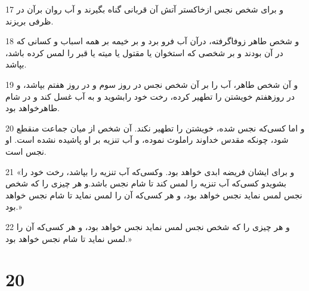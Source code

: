 \par 17 و برای شخص نجس ازخاکستر آتش آن قربانی گناه بگیرند و آب روان برآن در ظرفی بریزند.
\par 18 و شخص طاهر زوفاگرفته، درآن آب فرو برد و بر خیمه بر همه اسباب و کسانی که در آن بودند و بر شخصی که استخوان یا مقتول یا میته یا قبر را لمس کرده باشد، بپاشد.
\par 19 و آن شخص طاهر، آب را بر آن شخص نجس در روز سوم و در روز هفتم بپاشد، و در روزهفتم خویشتن را تطهیر کرده، رخت خود رابشوید و به آب غسل کند و در شام طاهرخواهد بود.
\par 20 و اما کسی‌که نجس شده، خویشتن را تطهیر نکند. آن شخص از میان جماعت منقطع شود، چونکه مقدس خداوند راملوث نموده، و آب تنزیه بر او پاشیده نشده است. او نجس است.
\par 21 «و برای ایشان فریضه ابدی خواهد بود. وکسی‌که آب تنزیه را بپاشد، رخت خود را بشویدو کسی‌که آب تنزیه را لمس کند تا شام نجس باشد.و هر چیزی را که شخص نجس لمس نماید نجس خواهد بود، و هر کسی‌که آن را لمس نماید تا شام نجس خواهد بود.»
\par 22 و هر چیزی را که شخص نجس لمس نماید نجس خواهد بود، و هر کسی‌که آن را لمس نماید تا شام نجس خواهد بود.»
 
\chapter{20}

